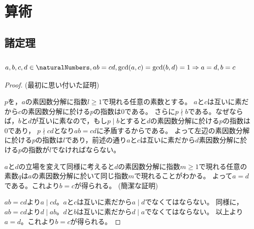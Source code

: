 \chapter{算術}
    \section{諸定理}
        \subsection{\texorpdfstring{$a,b,c,d\in\naturalNumbers,ab=cd,\gcd(a,c)=\gcd(b,d)=1 \Rightarrow a=d,b=c$}{a,b,c,dは自然数, ab=cd, gcd(a,c)=gcd(b,d)=1 ⇔ a=d,b=c}}
            \label{互いに素な2組の数と積の関係}
            \begin{proof}
                (最初に思い付いた証明)
                \par
                $p$を，$a$の素因数分解に指数$l\geq1$で現れる任意の素数とする。
                $a$と$c$は互いに素だから$c$の素因数分解に於ける$p$の指数は0である。
                さらに$p\nmid b$である。なぜならば，$b$と$d$が互いに素なので，もし$p\mid b$とすると$d$の素因数分解に於ける$p$の指数は0であり，
                $p\nmid cd$となり$ab=cd$に矛盾するからである。
                よって左辺の素因数分解に於ける$p$の指数は$l$であり，前述の通り$a$と$c$は互いに素だから$d$素因数分解に於ける$p$の指数が$l$でなければならない。
                \par
                $a$と$d$の立場を変えて同様に考えると$d$の素因数分解に指数$m\geq1$で現れる任意の素数$q$は$a$の素因数分解に於いて同じ指数$m$で現れることがわかる。
                よって$a=d$である。これより$b=c$が得られる。
                \newline
                \newline
                (簡潔な証明)
                \par
                $ab=cd$より$a\mid cd$。$a$と$c$は互いに素だから$a\mid d$でなくてはならない。
                同様に，$ab=cd$より$d\mid ab$。$d$と$b$は互いに素だから$d\mid a$でなくてはならない。
                以上より$a=d$。これより$b=c$が得られる。
            \end{proof}
